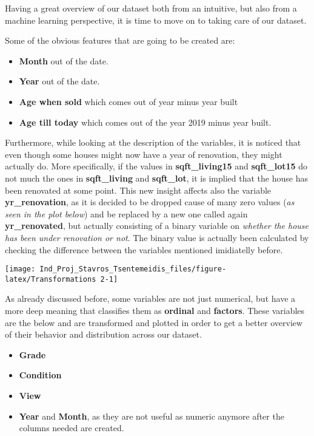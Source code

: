 \documentclass[]{article}
\providecommand{\tightlist}{%
  \setlength{\itemsep}{0pt}\setlength{\parskip}{0pt}}
\begin{document}
Having a great overview of our dataset both from an intuitive, but also
from a machine learning perspective, it is time to move on to taking
care of our dataset.

Some of the obvious features that are going to be created are:

\begin{itemize}
\tightlist
\item
  \textbf{Month} out of the date.\\
\item
  \textbf{Year} out of the date.\\
\item
  \textbf{Age when sold} which comes out of year minus year built
\item
  \textbf{Age till today} which comes out of the year 2019 minus year
  built.
\end{itemize}

Furthermore, while looking at the description of the variables, it is
noticed that even though some houses might now have a year of
renovation, they might actually do. More specifically, if the values in
\textbf{sqft\_living15} and \textbf{sqft\_lot15} do not much the ones in
\textbf{sqft\_living} and \textbf{sqft\_lot}, it is implied that the
house has been renovated at some point. This new insight affects also
the variable \textbf{yr\_renovation}, as it is decided to be dropped
cause of many zero values (\emph{as seen in the plot below}) and be
replaced by a new one called again \textbf{yr\_renovated}, but actually
consisting of a binary variable on \emph{whether the house has been
under renovation or not}. The binary value is actually been calculated
by checking the difference between the variables mentioned imidiatelly
before.

\begin{center}\texttt{[image: Ind\_Proj\_Stavros\_Tsentemeidis\_files/figure-latex/Transformations 2-1]} \end{center}

As already discussed before, some variables are not just numerical, but
have a more deep meaning that classifies them as \textbf{ordinal} and
\textbf{factors}. These variables are the below and are transformed and
plotted in order to get a better overview of their behavior and
distribution across our dataset.

\begin{itemize}
\tightlist
\item
  \textbf{Grade}\\
\item
  \textbf{Condition}
\item
  \textbf{View}\\
\item
  \textbf{Year} and \textbf{Month}, as they are not useful as numeric
  anymore after the columns needed are created.
\end{itemize}
\end{document}

